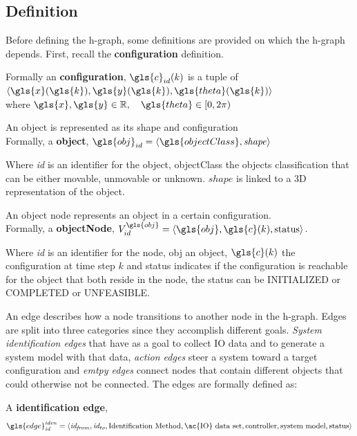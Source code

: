 \subsection{Definition}%
\label{subsec:h-graph_definition}%
Before defining the \ac{h-graph}, some definitions are provided on which the \ac{h-graph} depends. First, recall the \textbf{configuration} definition.\bs

Formally an \textbf{configuration}, $\gls{c}_{id}(k)$ is a tuple of $\left\langle \gls{x}(\gls{k}), \gls{y}(\gls{k}), \gls{theta}(\gls{k})\right\rangle$\\ where $\gls{x}, \gls{y} \in \mathbb{R}, \quad  \gls{theta} \in [0, 2\pi)$\bs

An object is represented as its shape and configuration\\Formally, a \textbf{object},  $\gls{obj}_{id} = \left\langle \gls{objectClass}, \mathit{shape} \right\rangle $\bs

Where \textit{id} is an identifier for the object, \gls{objectClass} the objects classification that can be either movable, unmovable or unknown. $\mathit{shape}$ is linked to a 3D representation of the object.\bs

An object node represents an object in a certain configuration.\\Formally, a \textbf{objectNode}, $V^{\gls{obj}}_{id} =\left\langle \gls{obj}, \gls{c}(k), \textrm{status} \right\rangle $.\bs

Where \textit{id} is an identifier for the node, \gls{obj} an object, $\gls{c}(k)$ the configuration at time step $k$ and status indicates if the configuration is reachable for the object that both reside in the node, the status can be INITIALIZED or COMPLETED or UNFEASIBLE.\bs

An edge describes how a node transitions to another node in the \ac{h-graph}. Edges are split into three categories since they accomplish different goals. \textit{System identification edges} that have as a goal to collect \ac{IO} data and to generate a system model with that data, \textit{action edges} steer a system toward a target configuration and \textit{emtpy edges} connect nodes that contain different objects that could otherwise not be connected. The edges are formally defined as:\bs

A \textbf{identification edge}, \[\gls{edge}^\mathit{iden}_\mathit{id} = \left\langle \mathit{id_{from}}, \mathit{id_{to}}, \textrm{Identification Method}, \textrm{\ac{IO} data set}, \textrm{controller}, \textrm{system model}, \textrm{status} \right\rangle\]\bs

